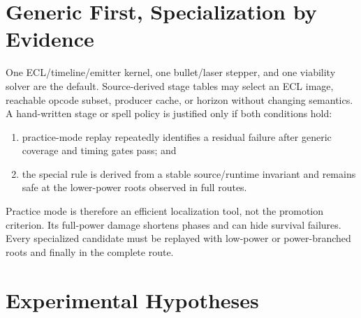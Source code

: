 \documentclass[10pt]{article}
\begin{document}
\section{Generic First, Specialization by Evidence}

One ECL/timeline/emitter kernel, one bullet/laser stepper, and one viability
solver are the default.  Source-derived stage tables may select an ECL image,
reachable opcode subset, producer cache, or horizon without changing semantics.
A hand-written stage or spell policy is justified only if both conditions hold:

\begin{enumerate}
  \item practice-mode replay repeatedly identifies a residual failure after
  generic coverage and timing gates pass; and
  \item the special rule is derived from a stable source/runtime invariant and
  remains safe at the lower-power roots observed in full routes.
\end{enumerate}

Practice mode is therefore an efficient localization tool, not the promotion
criterion.  Its full-power damage shortens phases and can hide survival
failures.  Every specialized candidate must be replayed with low-power or
power-branched roots and finally in the complete route.

\section{Experimental Hypotheses}
\end{document}
